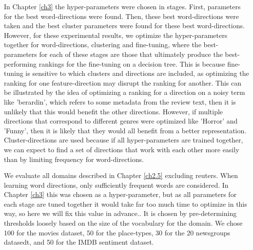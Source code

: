 
In Chapter \ref{ch3} the hyper-parameters were chosen in stages. First, parameters for the best word-directions were found. Then, these best word-directions were taken and the best cluster parameters were found for these  best word-directions. However, for these experimental results, we optimize the hyper-parameters together for word-directions, clustering and fine-tuning, where the best-parameters for each of these stages are those that ultimately produce the best-performing rankings for the fine-tuning on a decision tree.  This is because fine-tuning is sensitive to which clusters and directions are included, as optimizing the ranking for one feature-direction may disrupt the ranking for another. This can be illustrated by the idea of optimizing a ranking for a direction on a noisy term like 'berardin', which refers to some metadata from the review text, then it is unlikely that this would benefit the other directions. However, if multiple directions that correspond to different genres were optimized like 'Horror' and 'Funny', then it is likely that they would all benefit from a better representation. Cluster-directions are used because if all hyper-parameters are trained together, we can expect to find a set of directions that work with each other more easily than by limiting frequency for word-directions. 

We evaluate  all domains described in Chapter \ref{ch2.5} excluding reuters. When learning word directions, only sufficiently frequent words are considered. In Chapter \ref{ch3} this was chosen as a hyper-parameter, but as all parameters for each stage are tuned together it would take far too much time to optimize in this way, so here we will fix this value in advance.. It is chosen by pre-determining thresholds loosely based on the size of the vocabulary for the domain. We chose 100 for the movies dataset,  50 for the place-types, 30 for the 20 newsgroups datasedt, and 50 for the IMDB sentiment dataset. 

